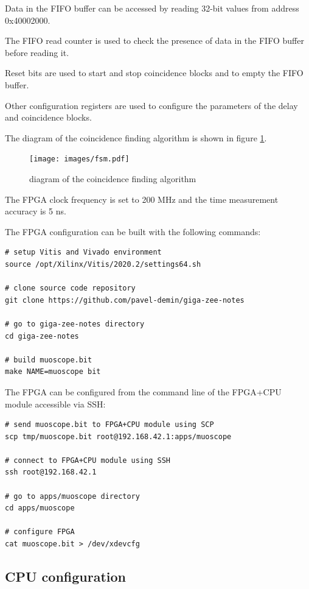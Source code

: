 \documentclass[12pt, a4paper]{article}
\begin{document}
Data in the FIFO buffer can be accessed by reading 32-bit values from address 0x40002000.

The FIFO read counter is used to check the presence of data in the FIFO buffer before reading it.

Reset bits are used to start and stop coincidence blocks and to empty the FIFO buffer.

Other configuration registers are used to configure the parameters of the delay and coincidence blocks.

The diagram of the coincidence finding algorithm is shown in figure \ref{fig:fsm}.

\begin{figure}[h!]
  \centering
  \texttt{[image: images/fsm.pdf]}
  \caption{diagram of the coincidence finding algorithm}
  \label{fig:fsm}
\end{figure}

The FPGA clock frequency is set to 200 MHz and the time measurement accuracy is 5 ns.

The FPGA configuration can be built with the following commands:
\vspace{-1ex}
\begin{verbatim}
# setup Vitis and Vivado environment
source /opt/Xilinx/Vitis/2020.2/settings64.sh

# clone source code repository
git clone https://github.com/pavel-demin/giga-zee-notes

# go to giga-zee-notes directory
cd giga-zee-notes

# build muoscope.bit
make NAME=muoscope bit
\end{verbatim}

The FPGA can be configured from the command line of the FPGA+CPU module accessible via SSH:
\vspace{-1ex}
\begin{verbatim}
# send muoscope.bit to FPGA+CPU module using SCP
scp tmp/muoscope.bit root@192.168.42.1:apps/muoscope

# connect to FPGA+CPU module using SSH
ssh root@192.168.42.1

# go to apps/muoscope directory
cd apps/muoscope

# configure FPGA
cat muoscope.bit > /dev/xdevcfg
\end{verbatim}

\subsection{CPU configuration}
\end{document}
